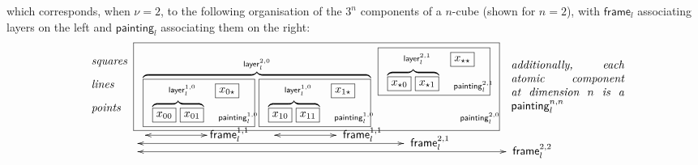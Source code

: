 \documentclass[12pt,landscape]{article}
\newcommand{\mybox}[1]{\mathsf{frame}_{#1}}
\newcommand{\mylayer}[1]{\mathsf{layer}_{#1}}
\newcommand{\mycube}[1]{\mathsf{painting}_{#1}}
\begin{document}
\begin{LARGE}
\begin{sf}
\noindent which corresponds, when $\nu=2$, to
the following organisation of the $3^n$ components of a $n$-cube (shown for $n=2$), with
$\mybox{l}$ associating layers on the left and $\mycube{l}$ associating them
on the right:
$$
\begin{array}{l}
\begin{array}{lll}
\mbox{\textit{squares}}\\
[3mm]\mbox{\textit{lines}}\\
[3mm]\mbox{\textit{points}}\\
[1mm]\end{array}
\framebox{$\begin{array}{lll}
\overbrace{\raisebox{0.05cm}{\framebox{$
\begin{array}{ll}
\raisebox{0cm}{\hspace{.5cm}{\scriptsize$\mylayer{l}^{1,0}$}}  & \framebox{$x_{0\star}$}\\
[1mm]\overbrace{\framebox{$x_{00}$}~\framebox{$x_{01}$}}&
\raisebox{-0.1cm}{{\scriptsize \hspace{0.1cm}$\mycube{l}^{1,0}\!\!\!\!\!\!\!\!$}}
\\
\end{array}
$}}~
{\raisebox{0.05cm}{\framebox{$
\begin{array}{ll}
\raisebox{0cm}{\hspace{.5cm}{\scriptsize$\mylayer{l}^{1,0}$}}  & \framebox{$x_{1\star}$}\\
[1mm]\overbrace{\framebox{$x_{10}$}~\framebox{$x_{11}$}}&
\raisebox{-0.1cm}{{\scriptsize \hspace{0.1cm}$\mycube{l}^{1,0}\!\!\!\!\!\!\!\!$}}
\end{array}
$}}}}^{\mylayer{l}^{2,0}}~
\stackrel{\raisebox{9.5mm}{$\framebox{$
\begin{array}{ll}
\raisebox{0cm}{\hspace{.5cm}{\scriptsize$\mylayer{l}^{2,1}$}} & \framebox{$x_{\star\star}$}\\
[1mm]\overbrace{\framebox{$x_{\star 0}$}~\framebox{$x_{\star 1}$}}&
\raisebox{-0.1cm}{{\scriptsize \hspace{0.1cm}$\mycube{l}^{2,1}\!\!\!\!\!\!\!\!$}}
\end{array}
$}
$}}{\raisebox{-0.4cm}{{\scriptsize \hspace{2.5cm}$\mycube{l}^{2,0}\!\!\!\!\!\!\!$}}}
\end{array}$}
~~~\parbox{3.5cm}{{\it additionally, each atomic component at dimension $n$ is a $\mycube{l}^{n,n}$}}\\
[-1mm]\qquad\qquad~~\xymatrix{ \ar@{<->}[rr] & & }\!\!\mbox{\normalsize $\mybox{l}^{1,1}$}
      \quad~~\xymatrix{ \ar@{<->}[rr] & & }\mbox{\normalsize $\mybox{l}^{1,1}$}\\
[-2mm]\qquad\qquad\xymatrix{ \ar@{<->}[rrrrrrrr] & & & & & & & & }\mbox{\normalsize$\mybox{l}^{2,1}$}\\
[-2mm]\qquad\qquad\xymatrix{ \ar@{<->}[rrrrrrrrrrr] & & & & & & & & & & & }\mbox{\normalsize$\mybox{l}^{2,2}$}\\
\end{array}
$$


\end{sf}
\end{LARGE}
\end{document}
